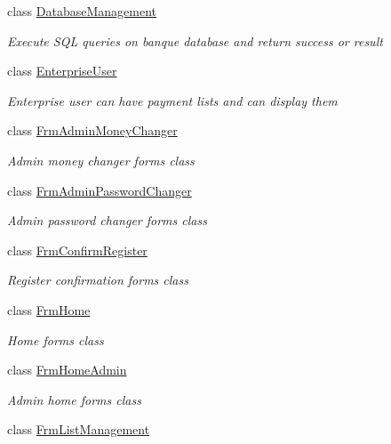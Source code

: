 \begin{DoxyCompactItemize}
class \mbox{\hyperlink{class_projet_banque_1_1_database_management}{Database\+Management}}
\begin{DoxyCompactList}\small\item\em Execute S\+QL queries on banque database and return success or result \end{DoxyCompactList}\item 
class \mbox{\hyperlink{class_projet_banque_1_1_enterprise_user}{Enterprise\+User}}
\begin{DoxyCompactList}\small\item\em Enterprise user can have payment lists and can display them \end{DoxyCompactList}\item 
class \mbox{\hyperlink{class_projet_banque_1_1_frm_admin_money_changer}{Frm\+Admin\+Money\+Changer}}
\begin{DoxyCompactList}\small\item\em Admin money changer form\textquotesingle{}s class \end{DoxyCompactList}\item 
class \mbox{\hyperlink{class_projet_banque_1_1_frm_admin_password_changer}{Frm\+Admin\+Password\+Changer}}
\begin{DoxyCompactList}\small\item\em Admin password changer form\textquotesingle{}s class \end{DoxyCompactList}\item 
class \mbox{\hyperlink{class_projet_banque_1_1_frm_confirm_register}{Frm\+Confirm\+Register}}
\begin{DoxyCompactList}\small\item\em Register confirmation form\textquotesingle{}s class \end{DoxyCompactList}\item 
class \mbox{\hyperlink{class_projet_banque_1_1_frm_home}{Frm\+Home}}
\begin{DoxyCompactList}\small\item\em Home form\textquotesingle{}s class \end{DoxyCompactList}\item 
class \mbox{\hyperlink{class_projet_banque_1_1_frm_home_admin}{Frm\+Home\+Admin}}
\begin{DoxyCompactList}\small\item\em Admin home form\textquotesingle{}s class \end{DoxyCompactList}\item 
class \mbox{\hyperlink{class_projet_banque_1_1_frm_list_management}{Frm\+List\+Management}}

\end{DoxyCompactItemize}

